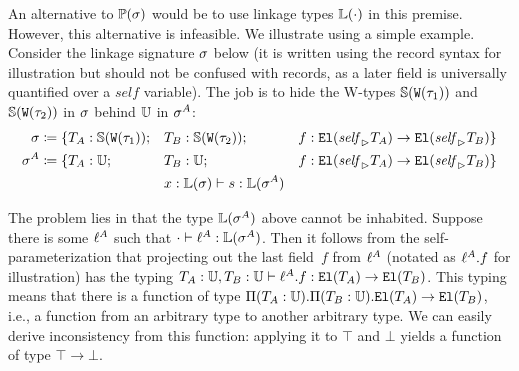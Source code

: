 An alternative to $\mathbb{P}({\sigma})$ would be to use linkage types $\mathbb{L}({\cdot})$ in this premise.
However, this alternative is infeasible.
We illustrate using a simple example.
Consider the linkage signature $\sigma$ below (it is written using the record
syntax for illustration but should not be confused with records, as a later field
is universally quantified over a $\mathit{self}$ variable).
The job is to hide the W-types $\mathbb{S}({\texttt{W}({\tau_1})})$ and
$\mathbb{S}({\texttt{W}({\tau_2})})$ in $\sigma$ behind $\mathbb{U}$ in $\sigma^A$:
%
\begin{align*}
  \sigma &\coloneq \{ T_A : \mathbb{S}({\texttt{W}({\tau_1})}); &&T_B : \mathbb{S}({\texttt{W}({\tau_2})}); &&f : \texttt{El}({{\mathit{self}}_{\rhd}{T_A}}) \to \texttt{El}({{\mathit{self}}_{\rhd}{T_B}}) \} \\
  \sigma^A &\coloneq \{T_A : \mathbb{U}; &&T_B : \mathbb{U}; &&f : \texttt{El}({{\mathit{self}}_{\rhd}{T_A}}) \to \texttt{El}({{\mathit{self}}_{\rhd}{T_B}}) \} \\
  & &&  {x : \mathbb{L}({\sigma})} \vdash {\ensuremath{s}} : {\mathbb{L}({\sigma^A})} 
\end{align*}


The problem lies in that the type $\mathbb{L}({\sigma^A})$ above cannot be inhabited.
Suppose there is some $\ell^A$ such that $\cdot \vdash \ell^A : \mathbb{L}({\sigma^A})$.
Then it follows from the self-parameterization that projecting out the last field~$f$
from $\ell^A$ (notated as $\ell^A.f$ for illustration) has the typing
$ {T_A : \mathbb{U}, T_B: \mathbb{U}} \vdash {\ensuremath{\ell}^A.f} : {\texttt{El}({T_A}) \to \texttt{El}({T_B})} $.
This typing means that there is a function of type
$\Pi({T_A}:{\mathbb{U}}).{\Pi({T_B}:{\mathbb{U}}).{\texttt{El}({T_A})
\to \texttt{El}({T_B})}}$, i.e., a function from an arbitrary type to another arbitrary
type. We can easily derive inconsistency from this function:
applying it to $\top$ and $\bot$ yields a function of type $\top\to\bot$.

